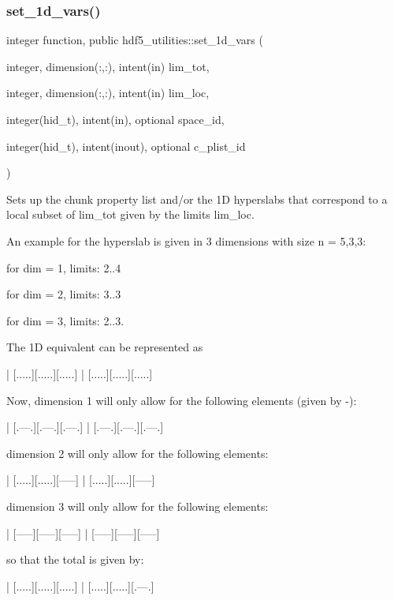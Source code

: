 \subsubsection{\texorpdfstring{set\+\_\+1d\+\_\+vars()}{set\_1d\_vars()}}
{\footnotesize\ttfamily integer function, public hdf5\+\_\+utilities\+::set\+\_\+1d\+\_\+vars (\begin{DoxyParamCaption}\item[{integer, dimension(\+:,\+:), intent(in)}]{lim\+\_\+tot,  }\item[{integer, dimension(\+:,\+:), intent(in)}]{lim\+\_\+loc,  }\item[{integer(hid\+\_\+t), intent(in), optional}]{space\+\_\+id,  }\item[{integer(hid\+\_\+t), intent(inout), optional}]{c\+\_\+plist\+\_\+id }\end{DoxyParamCaption})}



Sets up the chunk property list and/or the 1D hyperslabs that correspond to a local subset of {\ttfamily lim\+\_\+tot} given by the limits {\ttfamily lim\+\_\+loc}. 

An example for the hyperslab is given in 3 dimensions with size n = 5,3,3\+:
\begin{DoxyItemize}
\item for dim = 1, limits\+: 2..4
\item for dim = 2, limits\+: 3..3
\item for dim = 3, limits\+: 2..3.
\end{DoxyItemize}

The 1D equivalent can be represented as 
\begin{DoxyCode}
[.....][.....][.....] | [.....][.....][.....] | [.....][.....][.....]
\end{DoxyCode}
 Now, dimension 1 will only allow for the following elements (given by {\ttfamily -\/})\+: 
\begin{DoxyCode}
[.---.][.---.][.---.] | [.---.][.---.][.---.] | [.---.][.---.][.---.]
\end{DoxyCode}
 dimension 2 will only allow for the following elements\+: 
\begin{DoxyCode}
[.....][.....][-----] | [.....][.....][-----] | [.....][.....][-----]
\end{DoxyCode}
 dimension 3 will only allow for the following elements\+: 
\begin{DoxyCode}
[.....][.....][.....] | [-----][-----][-----] | [-----][-----][-----]
\end{DoxyCode}
 so that the total is given by\+: 
\begin{DoxyCode}
[.....][.....][.....] | [.....][.....][.....] | [.....][.....][.---.]
\end{DoxyCode}


